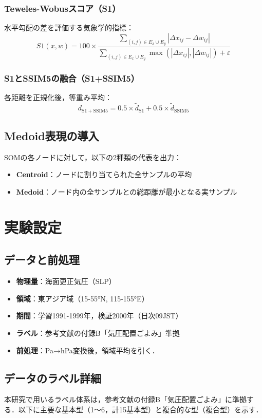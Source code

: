 \documentclass{jarticle}
\theoremstyle{definition}
\begin{document}
\subsubsection{Teweles-Wobusスコア（S1）}
水平勾配の差を評価する気象学的指標：
\begin{equation}
S1(x,w) = 100 \times \frac{\sum_{(i,j)\in E_x \cup E_y} |\Delta x_{ij} - \Delta w_{ij}|}{\sum_{(i,j)\in E_x \cup E_y} \max(|\Delta x_{ij}|, |\Delta w_{ij}|) + \varepsilon}
\end{equation}
\subsubsection{S1とSSIM5の融合（S1+SSIM5）}
各距離を正規化後，等重み平均：
\begin{equation}
d_{\mathrm{S1+SSIM5}} = 0.5 \times \tilde{d}_{\mathrm{S1}} + 0.5 \times \tilde{d}_{\mathrm{SSIM5}}
\end{equation}
\subsection{Medoid表現の導入}
SOMの各ノードに対して，以下の2種類の代表を出力：
\begin{itemize}
\item \textbf{Centroid}：ノードに割り当てられた全サンプルの平均
\item \textbf{Medoid}：ノード内の全サンプルとの総距離が最小となる実サンプル
\end{itemize}
\section{実験設定}
\subsection{データと前処理}
\begin{itemize}
\item \textbf{物理量}：海面更正気圧（SLP）
\item \textbf{領域}：東アジア域（15-55°N, 115-155°E）
\item \textbf{期間}：学習1991-1999年，検証2000年（日次09JST）
\item \textbf{ラベル}：参考文献\cite{吉野2002日本の気候}の付録B「気圧配置ごよみ」準拠
\item \textbf{前処理}：Pa→hPa変換後，領域平均を引く．
\end{itemize}
\subsection{データのラベル詳細}
本研究で用いるラベル体系は，参考文献\cite{吉野2002日本の気候}の付録B「気圧配置ごよみ」に準拠する．以下に主要な基本型（1〜6，計15基本型）と複合的な型（複合型）を示す．
\end{document}
